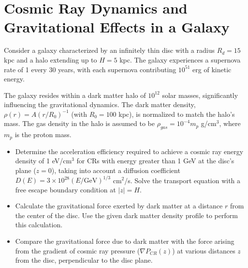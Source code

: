 \section{Cosmic Ray Dynamics and Gravitational Effects in a Galaxy}

Consider a galaxy characterized by an infinitely thin disc with a radius \(R_d = 15\) kpc and a halo extending up to \(H = 5\) kpc. The galaxy experiences a supernova rate of 1 every 30 years, with each supernova contributing \(10^{51}\) erg of kinetic energy. 

The galaxy resides within a dark matter halo of \(10^{12}\) solar masses, significantly influencing the gravitational dynamics. The dark matter density, \(\rho(r) = A(r/R_0)^{-1}\) (with \(R_0 = 100\) kpc), is normalized to match the halo's mass. The gas density in the halo is assumed to be \(\rho_{gas} = 10^{-4} m_p\) g/cm\(^3\), where \(m_p\) is the proton mass.

\begin{itemize}
\item Determine the acceleration efficiency required to achieve a cosmic ray energy density of 1 eV/cm\(^3\) for CRs with energy greater than 1 GeV at the disc's plane (\(z = 0\)), taking into account a diffusion coefficient \(D(E) = 3 \times 10^{28} (E / \text{GeV})^{1/3}\) cm\(^2\)/s. Solve the transport equation with a free escape boundary condition at \(|z| = H\). 
\item Calculate the gravitational force exerted by dark matter at a distance \(r\) from the center of the disc. Use the given dark matter density profile to perform this calculation.
\item Compare the gravitational force due to dark matter with the force arising from the gradient of cosmic ray pressure (\(\nabla P_{CR}(z)\)) at various distances \(z\) from the disc, perpendicular to the disc plane.
\end{itemize}
